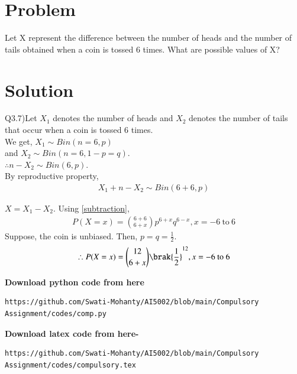 \documentclass[journal,12pt,twocolumn]{IEEEtran}
\begin{document}
\section{Problem}
Let X represent the difference between the
number of heads and the number of tails
obtained when a coin is tossed 6 times. What
are possible values of X?
\section{Solution}
Q3.7)Let $X_1$ denotes the number of heads and $X_2$ denotes the number of tails that occur when a coin is tossed 6 times.\\
We get, $X_1 \sim Bin(n=6, p)$\\
and $X_2 \sim Bin(n=6,1-p=q)$.\\
$\therefore n-X_2 \sim Bin(6, p)$.\\
By reproductive property,
\begin{align}
    X_1+n-X_2 \sim Bin(6+6, p)
\end{align}

$X=X_1-X_2$. Using \eqref{subtraction},
\begin{align}
    P(X=x) = \binom{6+6}{6+x} p^{6+x} q^{6-x}, x= -6\ \text{to}\ 6 
\end{align}
Suppose, the coin is unbiased. Then, $p=q= \frac{1}{2}$.
\begin{align}
    \therefore P(X=x) = \binom{12}{6+x}\brak{\frac{1}{2}}^{12}, x= -6\ \text{to}\ 6 
\end{align}

\textbf{Download python code from here}\\
\begin{lstlisting}
https://github.com/Swati-Mohanty/AI5002/blob/main/Compulsory Assignment/codes/comp.py
\end{lstlisting}
\textbf{Download latex code from here-}\\
\begin{lstlisting}
https://github.com/Swati-Mohanty/AI5002/blob/main/Compulsory Assignment/codes/compulsory.tex
\end{lstlisting}
\end{document}
